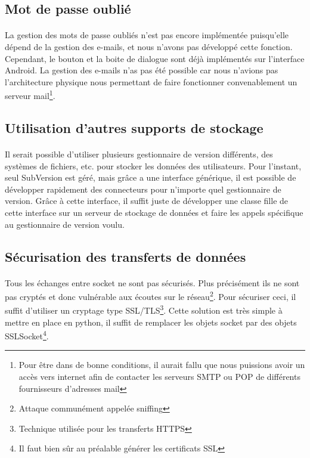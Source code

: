 \documentclass[a4paper,12pt]{article}
\begin{document}
\subsection{Mot de passe oublié}
\paragraph*{}
La gestion des mots de passe oubliés n'est pas encore implémentée puisqu'elle dépend de la gestion des e-mails, et nous n'avons pas développé cette fonction. Cependant, le bouton et la boite de dialogue sont déjà implémentés sur l'interface Android. La gestion des e-mails n'as pas été possible car nous n'avions pas l'architecture physique nous permettant de faire fonctionner convenablement un serveur mail\footnote{Pour être dans de bonne conditions, il aurait fallu que nous puissions avoir un accès vers internet afin de contacter les serveurs SMTP ou POP de différents fournisseurs d'adresses mail}.

\subsection{Utilisation d'autres supports de stockage}
\paragraph*{}
Il serait possible d'utiliser plusieurs gestionnaire de version différents, des systèmes de fichiers, etc. pour stocker les données des utilisateurs. Pour l'instant, seul SubVersion est géré, mais grâce a une interface générique, il est possible de développer rapidement des connecteurs pour n'importe quel gestionnaire de version. Grâce à cette interface, il suffit juste de développer une classe fille de cette interface sur un serveur de stockage de données et faire les appels spécifique au gestionnaire de version voulu.

\subsection{Sécurisation des transferts de données}
\paragraph*{}
Tous les échanges entre socket ne sont pas sécurisés. Plus précisément ils ne sont pas cryptés et donc vulnérable aux écoutes sur le réseau\footnote{Attaque communément appelée sniffing}. Pour sécuriser ceci, il suffit d'utiliser un cryptage type SSL/TLS\footnote{Technique utilisée pour les transferts HTTPS}. Cette solution est très simple à mettre en place en python, il suffit de remplacer les objets socket par des objets SSLSocket\footnote{Il faut bien sûr au préalable générer les certificats SSL}.
\end{document}
